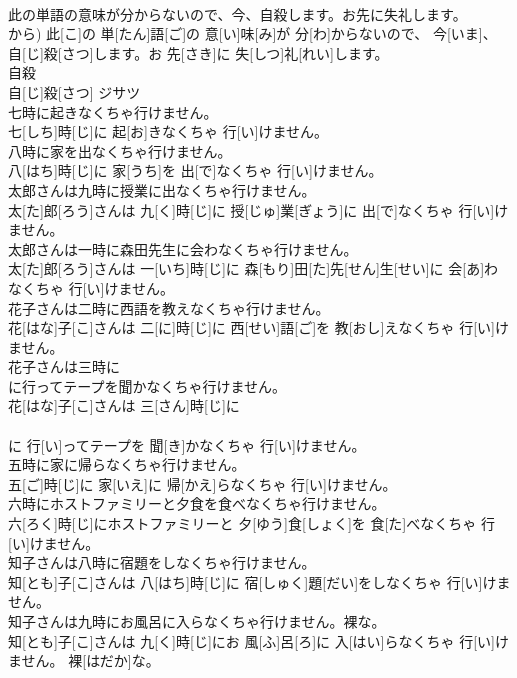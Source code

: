 \documentclass[8pt]{extreport}
\begin{document}
\begin{CJK}{UTF8}{min}
\\	此の単語の意味が分からないので、今、自殺します。お先に失礼します。	
\\	から)	此[こ]の 単[たん]語[ご]の 意[い]味[み]が 分[わ]からないので、 今[いま]、 自[じ]殺[さつ]します。お 先[さき]に 失[しつ]礼[れい]します。
\\	自殺	
\\	自[じ]殺[さつ]	ジサツ
\\	七時に起きなくちゃ行けません。	
\\	七[しち]時[じ]に 起[お]きなくちゃ 行[い]けません。
\\	八時に家を出なくちゃ行けません。	
\\	八[はち]時[じ]に 家[うち]を 出[で]なくちゃ 行[い]けません。
\\	太郎さんは九時に授業に出なくちゃ行けません。	
\\	太[た]郎[ろう]さんは 九[く]時[じ]に 授[じゅ]業[ぎょう]に 出[で]なくちゃ 行[い]けません。
\\	太郎さんは一時に森田先生に会わなくちゃ行けません。	
\\	太[た]郎[ろう]さんは 一[いち]時[じ]に 森[もり]田[た]先[せん]生[せい]に 会[あ]わなくちゃ 行[い]けません。
\\	花子さんは二時に西語を教えなくちゃ行けません。	
\\	花[はな]子[こ]さんは 二[に]時[じ]に 西[せい]語[ご]を 教[おし]えなくちゃ 行[い]けません。
\\	花子さんは三時に
\\	に行ってテープを聞かなくちゃ行けません。	
\\	花[はな]子[こ]さんは 三[さん]時[じ]に 
\\	[エル]
\\	[エル]に 行[い]ってテープを 聞[き]かなくちゃ 行[い]けません。
\\	五時に家に帰らなくちゃ行けません。	
\\	五[ご]時[じ]に 家[いえ]に 帰[かえ]らなくちゃ 行[い]けません。
\\	六時にホストファミリーと夕食を食べなくちゃ行けません。	
\\	六[ろく]時[じ]にホストファミリーと 夕[ゆう]食[しょく]を 食[た]べなくちゃ 行[い]けません。
\\	知子さんは八時に宿題をしなくちゃ行けません。	
\\	知[とも]子[こ]さんは 八[はち]時[じ]に 宿[しゅく]題[だい]をしなくちゃ 行[い]けません。
\\	知子さんは九時にお風呂に入らなくちゃ行けません。裸な。	
\\	知[とも]子[こ]さんは 九[く]時[じ]にお 風[ふ]呂[ろ]に 入[はい]らなくちゃ 行[い]けません。 裸[はだか]な。

\end{CJK}
\end{document}
